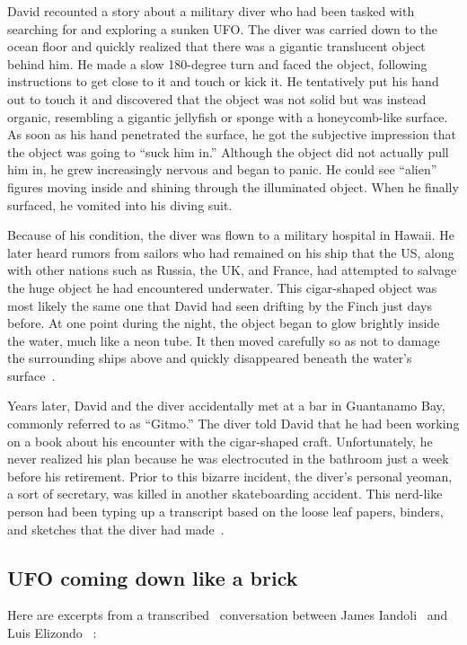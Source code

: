 David recounted a story about a military diver who had been tasked with searching for and exploring a sunken UFO. The diver was carried down to the ocean floor and quickly realized that there was a gigantic translucent object behind him. He made a slow 180-degree turn and faced the object, following instructions to get close to it and touch or kick it. He tentatively put his hand out to touch it and discovered that the object was not solid but was instead organic, resembling a gigantic jellyfish or sponge with a honeycomb-like surface. As soon as his hand penetrated the surface, he got the subjective impression that the object was going to ``suck him in.'' Although the object did not actually pull him in, he grew increasingly nervous and began to panic. He could see ``alien'' figures moving inside and shining through the illuminated object. When he finally surfaced, he vomited into his diving suit.

Because of his condition, the diver was flown to a military hospital in Hawaii.
He later heard rumors from sailors who had remained on his ship that the US, along with other nations such as Russia,
the UK, and France, had attempted to salvage the huge object he had encountered underwater. This cigar-shaped object was most likely
the same one that David had seen drifting by the Finch just days before. At one point during the night,
the object began to glow brightly inside the water, much like a neon tube. It then moved carefully so as not to damage
the surrounding ships above and quickly disappeared beneath the water's surface~\cite{Hein2018Dec}.


Years later, David and the diver accidentally met at a bar in Guantanamo Bay, commonly referred to as ``Gitmo.''
The diver told David that he had been working on a book about his encounter with the cigar-shaped craft.
Unfortunately, he never realized his plan because he was electrocuted in the bathroom just a week before his retirement.
Prior to this bizarre incident, the diver's personal yeoman, a sort of secretary, was killed in another skateboarding accident.
This nerd-like person had been typing up a transcript based on the loose leaf papers,
binders, and sketches that the diver had made~\cite{Hein2018Dec}.


\subsection{UFO coming down like a brick}


Here are excerpts from a transcribed~\cite[pp.~69,70]{Penetrator2022NovLooseThreads}
conversation between James Iandoli~ and  Luis Elizondo
~\cite[time = 38:19 min:sec]{Iandoli-Elizondo-Starfish-prime}:

